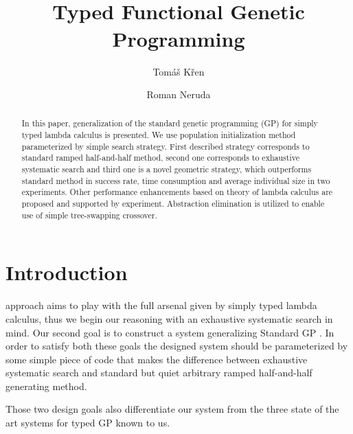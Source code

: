\documentclass[conference]{IEEEtran}
\begin{document}
\title{\ \\ \LARGE\bf Typed Functional Genetic Programming}

\author{Tom\'{a}\v{s} K\v{r}en \and Roman Neruda}


\maketitle

\begin{abstract}
In this paper, generalization of the standard genetic programming (GP)
for simply typed lambda calculus is presented. We use population 
initialization method parameterized by simple search strategy. 
First described strategy corresponds to standard ramped half-and-half method, 
second one corresponds to exhaustive systematic search and third one is a 
novel geometric strategy, which outperforms standard method in success 
rate, time consumption and average individual size in two experiments. 
Other performance enhancements based on theory of lambda calculus are 
proposed and supported by experiment. Abstraction elimination is 
utilized to enable use of simple tree-swapping crossover.
\end{abstract}

\section{Introduction}


 approach aims to play with the full arsenal given by simply typed lambda calculus, thus we begin our reasoning with an exhaustive systematic search
in mind. Our second goal is to construct a system generalizing Standard 
GP \cite{koza92}.
In order to satisfy both these goals the designed system should be 
parameterized by some simple piece of code that makes the difference
between exhaustive systematic search and standard but 
quiet arbitrary ramped half-and-half generating method. 

Those two design goals also differentiate our system from 
the three state of the art systems for typed GP known to us.
\end{document}
